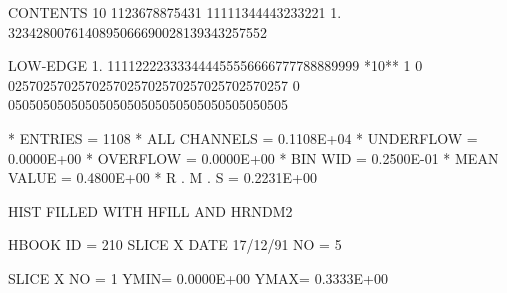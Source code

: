 \begin{Listing}
 CONTENTS  10        1123678875431 11111344443233221    
            1.     3234280076140895066690028139343257552
 
 LOW-EDGE   1.      111122223333444455556666777788889999
 *10**  1   0   0257025702570257025702570257025702570257
            0   0505050505050505050505050505050505050505
 
 * ENTRIES =       1108      * ALL CHANNELS = 0.1108E+04      * UNDERFLOW = 0.0000E+00      * OVERFLOW = 0.0000E+00
 * BIN WID = 0.2500E-01      * MEAN VALUE   = 0.4800E+00      * R . M . S = 0.2231E+00
 
 HIST FILLED WITH HFILL AND HRNDM2                                               
 
 HBOOK     ID =       210             SLICE X                    DATE  17/12/91              NO =   5
 
 SLICE X     NO =   1     YMIN=  0.0000E+00  YMAX=  0.3333E+00
 

\end{Listing}
